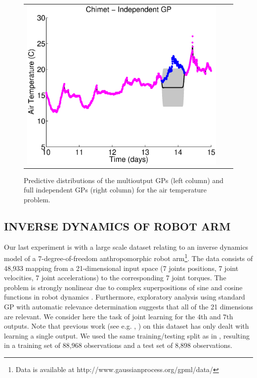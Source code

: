 \begin{figure}
\begin{tabular}{ccc}
\includegraphics[scale=0.3]{figures/weatherChimet.eps}
\end{tabular}
\caption{Predictive distributions of the multioutput GPs (left column) and full independent GPs (right column) for the air temperature problem.}
\label{fig:weather}
\end{figure}

\subsection{INVERSE DYNAMICS OF ROBOT ARM}
Our last experiment is with a large scale dataset relating to an inverse dynamics model of a 7-degree-of-freedom anthropomorphic robot arm\footnote{Data is available at http://www.gaussianprocess.org/gpml/data/}.
The data consists of 48,933 mapping from a 21-dimensional input space (7 joints positions, 7 joint velocities, 7 joint accelerations) to the corresponding 7 joint torques.
The problem is strongly nonlinear due to complex superpositions of sine and cosine functions in robot dynamics \citet{vijayakumar2000locally}.
Furthermore, exploratory analysis using standard GP with automatic relevance determination suggests that all of the 21 dimensions are relevant.
We consider here the task of joint learning for the $4$th and $7$th outputs.
Note that previous work (see e.g. \citet{rasmussen-williams-book},  \citet{vijayakumar2000locally}) on this dataset has only dealt with learning  a single output.
We used the same training/testing split as in \citet{rasmussen-williams-book}, resulting in a training set of 88,968 observations and a test set of 8,898 observations.

